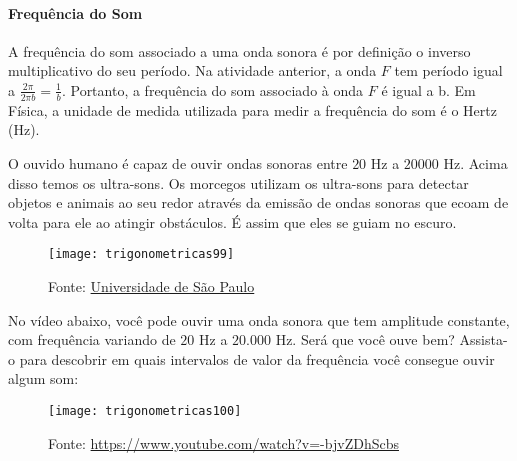 \begin{knowledge}
\label{trig-knowledge3}
\vspace{-2\parskip}
\paragraph{Frequência do Som}

A frequência do som associado a uma onda sonora é por definição o inverso multiplicativo do seu período. Na atividade anterior, a onda $F$ tem período igual a $\frac{2\pi}{2\pi b}=\frac{1}{b}$. Portanto, a frequência do som associado à onda $F$ é igual a b. Em Física, a unidade de medida utilizada para medir a frequência do som é o Hertz (Hz).

O ouvido humano é capaz de ouvir ondas sonoras entre $20$ Hz a $20000$ Hz. Acima disso temos os ultra-sons. Os morcegos utilizam os ultra-sons para detectar objetos e animais ao seu redor através da emissão de ondas sonoras que ecoam de volta para ele ao atingir obstáculos. É assim que eles se guiam no escuro.

\begin{figure}[H]
\centering

\texttt{[image: trigonometricas99]}
\caption{Fonte: \href{https://sites.usp.br/nupic/wp-content/uploads/sites/293/2017/11/M\%c3\%b3dulo-de-Ensino-OFICIAL.pdf}{Universidade de São Paulo}}

\end{figure}

No vídeo abaixo, você pode ouvir uma onda sonora que tem amplitude constante, com frequência variando de $20$ Hz a $20.000$ Hz. Será que você ouve bem? Assista-o para descobrir em quais intervalos de valor da frequência você consegue ouvir algum som:

\begin{figure}[H]
\centering

\texttt{[image: trigonometricas100]}
\caption{Fonte: \url{https://www.youtube.com/watch?v=-bjvZDhScbs}}
\end{figure}

\end{knowledge}
\clearpage

